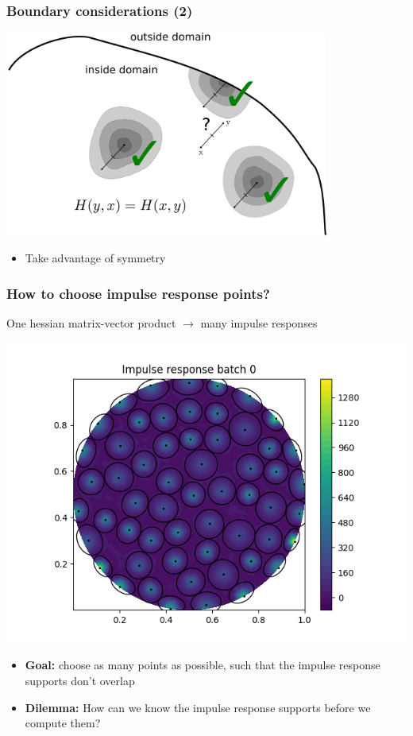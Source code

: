\documentclass[10pt,final,xcolor=dvipsnames]{beamer}
\begin{document}
\begin{frame}
	\frametitle{Boundary considerations (2)}
	\begin{center}
		\includegraphics[width=0.8\textwidth]{interpolation_rbf_adjoint.pdf}
	\end{center}
	\begin{itemize}
		\item Take advantage of symmetry
	\end{itemize}
\end{frame}
\begin{frame}
	\frametitle{How to choose impulse response points?}
	One hessian matrix-vector product $\rightarrow$ many impulse responses
	\begin{center}
		\includegraphics[width=0.5\columnwidth]{IRB1.png} 
	\end{center}
	\begin{itemize}
		\item \textbf{Goal:} choose as many points as possible, such that the impulse response supports don't overlap
		\item \textbf{Dilemma:} How can we know the impulse response supports before we compute them?
	\end{itemize}
\end{frame}
\end{document}
